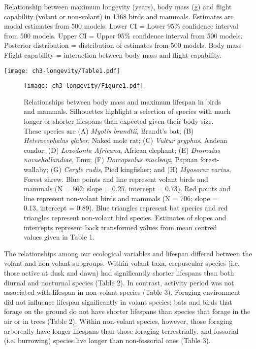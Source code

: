 \begin{table}[h]
  \caption[Table 1.]{Relationship between maximum longevity (years), body mass (g) and flight capability (volant or non-volant) in 1368 birds and mammals. Estimates are modal estimates from 500 models. Lower CI = Lower 95\% confidence interval from 500 models. Upper CI = Upper 95\% confidence interval from 500 models. Posterior distribution = distribution of estimates from 500 models. Body mass \: Flight capability = interaction between body mass and flight capability.}
  \label{tbl:Table 1.}
  \texttt{[image: ch3-longevity/Table1.pdf]}
\end{table}


\begin{figure}[p!]
  \centering
  \texttt{[image: ch3-longevity/Figure1.pdf]}
  \caption[Figure 1.]{Relationships between body mass and maximum lifespan in birds and mammals. Silhouettes highlight a selection of species with much longer or shorter lifespans than expected given their body size. These species are (A) \textit{Myotis brandtii}, Brandt's bat; (B) \textit{Heterocephalus glaber}, Naked mole rat; (C) \textit{Vultur gryphus}, Andean condor; (D) \textit{Loxodonta Africana}, African elephant; (E) \textit{Dromaius novaehollandiae}, Emu; (F) \textit{Dorcopsulus macleayi}, Papuan forest-wallaby; (G) \textit{Ceryle rudis}, Pied kingfisher; and (H) \textit{Myosorex varius}, Forest shrew. Blue points and line represent volant birds and mammals (N = 662; slope = 0.25, intercept = 0.73). Red points and line represent non-volant birds and mammals (N = 706; slope = 0.13, intercept = 0.89). Blue triangles represent bat species and red triangles represent non-volant bird species. Estimates of slopes and intercepts represent back transformed values from mean centred values given in Table 1.}
  \label{figure:Figure 1.}
\end{figure}


The relationships among our ecological variables and lifespan differed between the volant and non-volant subgroups. Within volant taxa, crepuscular species (i.e. those active at dusk and dawn) had significantly shorter lifespans than both diurnal and nocturnal species (Table 2). In contrast, activity period was not associated with lifespan in non-volant species (Table 3). Foraging environment did not influence lifespan significantly in volant species; bats and birds that forage on the ground do not have shorter lifespans than species that forage in the air or in trees (Table 2). Within non-volant species, however, those foraging arboreally have longer lifespans than those foraging terrestrially, and fossorial (i.e. burrowing) species live longer than non-fossorial ones (Table 3).


